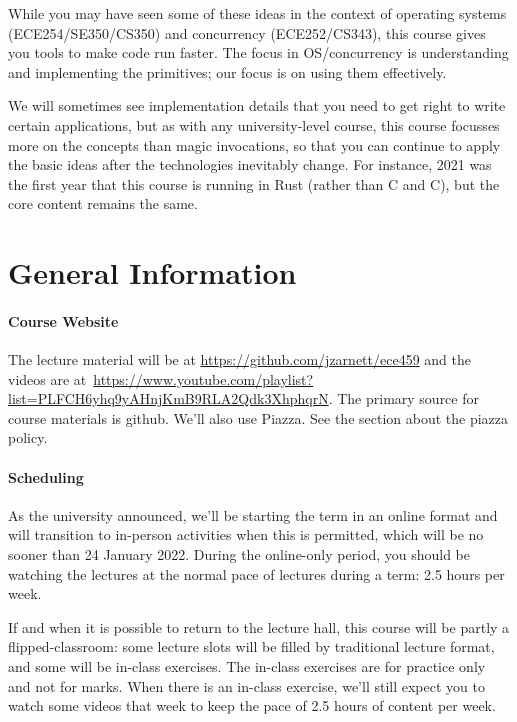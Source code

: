 \documentclass[letterpaper,10pt]{article}
\newcommand{\CPP}{C\nolinebreak\hspace{-.05em}\raisebox{.4ex}{\tiny\bf +}\nolinebreak\hspace{-.10em}\raisebox{.4ex}{\tiny\bf +}}
\def\CPP{{C\nolinebreak[4]\hspace{-.05em}\raisebox{.4ex}{\tiny\bf ++}}}
\begin{document}
While you may have seen some of these ideas in the context of
operating systems (ECE254/SE350/CS350) and concurrency (ECE252/CS343), this course gives you tools to make code run
faster. The focus in OS/concurrency is understanding and implementing the
primitives; our focus is on using them effectively. 

We will sometimes see implementation details that you need to get right to write
certain applications, but as with any university-level course, this course
focusses more on the concepts than magic invocations, so that you can continue
to apply the basic ideas after the technologies inevitably change. For instance,
2021 was the first year that this course is running in Rust (rather than C and \CPP),
but the core content remains the same.


\section*{General Information}

\paragraph{Course Website} The lecture material will be at \url{https://github.com/jzarnett/ece459} and the videos are at~\url{https://www.youtube.com/playlist?list=PLFCH6yhq9yAHnjKmB9RLA2Qdk3XhphqrN}.  The primary source for course materials is github. We'll also use Piazza. See the section about the piazza policy.

\paragraph{Scheduling}
As the university announced, we'll be starting the term in an online format and will transition to in-person activities when this is permitted, which will be no sooner than 24 January 2022. During the online-only period, you should be watching the lectures at the normal pace of lectures during a term: 2.5 hours per week.

If and when it is possible to return to the lecture hall, this course will be partly a flipped-classroom: some lecture slots will be filled by traditional lecture format, and some will be in-class exercises. The in-class exercises are for practice only and not for marks. When there is an in-class exercise, we'll still expect you to watch some videos that week to keep the pace of 2.5 hours of content per week. 

  
\end{document}
